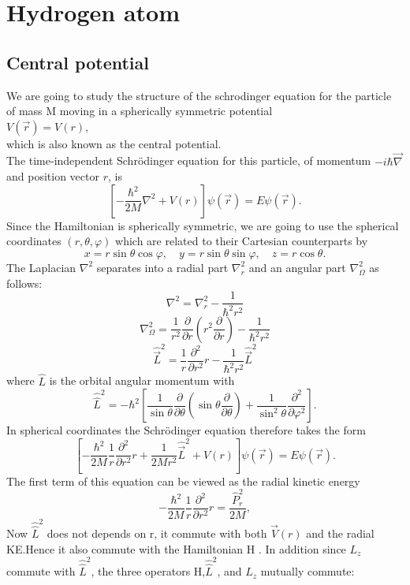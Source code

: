 \chapter{Hydrogen atom }
\section{Central potential}
We are going to study the structure of the schrodinger equation for the particle of mass M moving in a spherically symmetric potential\\
 $V(\vec{r})=V(r)$,\\
which is also known as the central potential.\\
The time-independent Schrödinger equation for this particle, of momentum $-i \hbar \vec{\nabla}$ and position vector $r$, is
$$
\left[-\frac{\hbar^{2}}{2 M} \nabla^{2}+V(r)\right] \psi(\vec{r})=E \psi(\vec{r}) .
$$
Since the Hamiltonian is spherically symmetric, we are going to use the spherical coordinates $(r, \theta, \varphi)$ which are related to their Cartesian counterparts by
$$
x=r \sin \theta \cos \varphi, \quad y=r \sin \theta \sin \varphi, \quad z=r \cos \theta .
$$
The Laplacian $\nabla^{2}$ separates into a radial part $\nabla_{r}^{2}$ and an angular part $\nabla_{\Omega}^{2}$ as follows:
$$
\nabla^{2}=\nabla_{r}^{2}-\frac{1}{\hbar^{2} r^{2}}$$
 $$\nabla_{\Omega}^{2}=\frac{1}{r^{2}} \frac{\partial}{\partial r}\left(r^{2} \frac{\partial}{\partial r}\right)-\frac{1}{\hbar^{2} r^{2}}$$ $$\hat{\vec{L}}^{2}=\frac{1}{r} \frac{\partial^{2}}{\partial r^{2}} r-\frac{1}{\hbar^{2} r^{2}} \hat{\vec{L}}^{2}
$$
where $\hat{L}$ is the orbital angular momentum with
$$
\hat{\hat{L}}^{2}=-\hbar^{2}\left[\frac{1}{\sin \theta} \frac{\partial}{\partial \theta}\left(\sin \theta \frac{\partial}{\partial \theta}\right)+\frac{1}{\sin ^{2} \theta} \frac{\partial^{2}}{\partial \varphi^{2}}\right] .
$$
In spherical coordinates the Schrödinger equation therefore takes the form
$$
\left[-\frac{\hbar^{2}}{2 M} \frac{1}{r} \frac{\partial^{2}}{\partial r^{2}} r+\frac{1}{2 M r^{2}} \hat{\vec{L}}^{2}+V(r)\right] \psi(\vec{r})=E \psi(\vec{r}) .
$$
The first term of this equation can be viewed as the radial kinetic energy
$$
-\frac{\hbar^{2}}{2 M} \frac{1}{r} \frac{\partial^{2}}{\partial r^{2}} r=\frac{\hat{P}_{r}^{2}}{2 M},
$$
Now $\hat{\hat{L}}^{2}$ does not depends on r, it commute with both $\vec{V}(r)$ and the radial KE.Hence it also commute with the Hamiltonian H . In addition since $L_z$ commute with $\hat{\hat{L}}^{2}$, the three operators H,$\hat{\hat{L}}^{2}$, and $L_z$ mutually commute:

